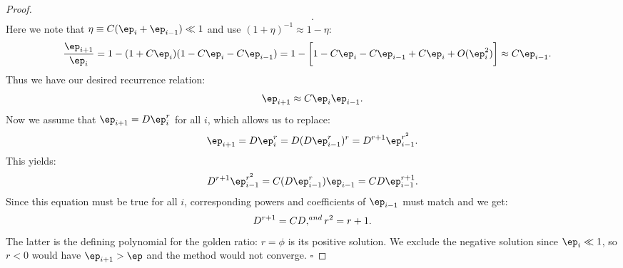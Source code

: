 \documentclass{article}
\begin{document}
\begin{proof}
\begin{align}
{    }.
\end{align}
Here we note that $\eta \equiv C(\ep_i + \ep_{i - 1}) \ll 1$ and
use $(1 + \eta)^{-1} \approx 1 - \eta$:
\begin{align}
    {\ep_{i+1} \over \ep_i} &=
    1 - (1 + C\ep_i)
    (1 - C\ep_i - C\ep_{i-1})
    = 1 - \bigg[1 - C\ep_i - C\ep_{i-1} + C\ep_i + O(\ep_i^2)\bigg]
    \approx C \ep_{i - 1}.
\end{align}
Thus we have our desired recurrence relation:
\begin{align}
    \ep_{i + 1} \approx C \ep_i \ep_{i - 1}.
\end{align}
Now we assume that $\ep_{i + 1} = D \ep_i^r$ for all $i$, which
allows us to replace:
\begin{align}
    \ep_{i + 1} = D \ep_i^r = D (D \ep_{i - 1}^r)^r =
    D^{r + 1} \ep_{i - 1}^{r^2}.
\end{align}
This yields:
\begin{align}
    D^{r + 1} \ep_{i - 1}^{r^2}
    = C (D \ep_{i-1}^r)\ep_{i - 1}
    = CD \ep_{i-1}^{r + 1}.
\end{align}
Since this equation must be true for all $i$, corresponding
powers and coefficients of $\ep_{i-1}$ must match and we get:
\begin{align}
    D^{r + 1} = CD,
    \sp{and} r^2 = r + 1.
\end{align}
The latter is the defining polynomial for the golden ratio:
$r = \phi$ is its positive solution. We exclude the negative solution
since $\ep_i \ll 1$, so $r < 0$ would have $\ep_{i+1} > \ep$ and
the method would not converge. $\square$
\end{proof}
\end{document}
